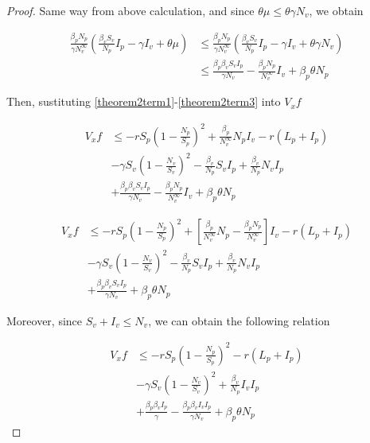\begin{proof}
	
	Same way from above calculation, and since $\theta \mu\leq \theta\gamma N_v$, we obtain
	
	\begin{equation}\label{theorem2term3}
		\begin{aligned}
			\frac{\beta_p N_p}{\gamma N^\infty_v}\left(\frac{\beta_v S_v}{N_p}I_p-\gamma I_v+\theta\mu\right)
				&\leq
					\frac{\beta_p N_p}{\gamma N^\infty_v}\left(\frac{\beta_v S_v}{N_p}I_p-\gamma I_v+\theta\gamma N_v\right)\\
				&\leq
					\frac{\beta_p\beta_v S_v I_p}{\gamma N_v}-\frac{\beta_p N_p}{ N^\infty_v}I_v + \beta_p\theta N_p
		\end{aligned}
	\end{equation}
	
	
	Then, sustituting \eqref{theorem2term1}-\eqref{theorem2term3} into $V_xf$
	
	\begin{align*}
		V_x f 
			&\leq
				- r S_p \left(1-\frac{N_p}{S_p}\right)^2 + \frac{\beta_p}{N^\infty_v}N_pI_v-r(L_p+I_p)\\
			&-
				\gamma S_v\left(1-\frac{N_v}{S_v}\right)^2-\frac{\beta_v}{N_p}S_vI_p+\frac{\beta_v}{N_p}N_vI_p\\
			&+
				\frac{\beta_p\beta_v S_v I_p}{\gamma N_v}-\frac{\beta_p N_p}{ N^\infty_v}I_v + \beta_p\theta N_p
	\end{align*}
		
	\begin{align*}
		V_x f 
			&\leq
				- r S_p \left(1-\frac{N_p}{S_p}\right)^2 + \left[\frac{\beta_p}{N^\infty_v}N_p-\frac{\beta_p N_p}{ N^\infty_v}\right]I_v-r(L_p+I_p)\\
			&-
				\gamma S_v\left(1-\frac{N_v}{S_v}\right)^2-\frac{\beta_v}{N_p}S_vI_p+\frac{\beta_v}{N_p}N_vI_p\\
			&+
				\frac{\beta_p\beta_v S_v I_p}{\gamma N_v} + \beta_p\theta N_p
	\end{align*}
	
	Moreover, since $S_v+I_v\leq N_v$, we can obtain the following relation
	
	\begin{align*}
		V_x f 
			&\leq
				- r S_p \left(1-\frac{N_p}{S_p}\right)^2 -r(L_p+I_p)\\
			&-
				\gamma S_v\left(1-\frac{N_v}{S_v}\right)^2+\frac{\beta_v}{N_p}I_vI_p\\
			&+
				\frac{\beta_p\beta_v I_p}{\gamma}-\frac{\beta_p\beta_v I_v I_p}{\gamma N_v} + \beta_p\theta N_p
	\end{align*}
	

\end{proof}
